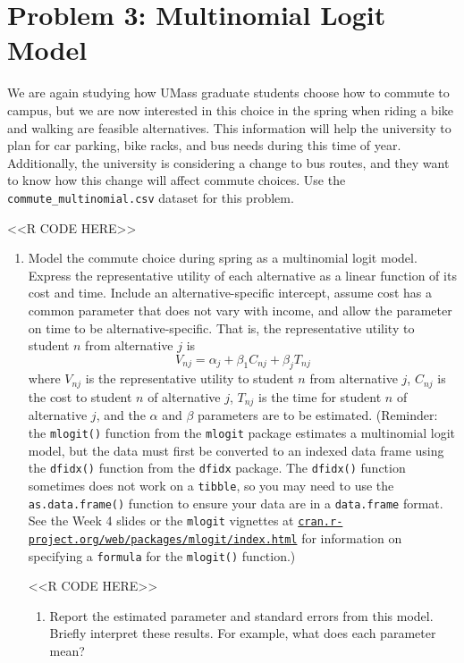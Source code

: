 \documentclass[11pt,letterpaper]{article}
\begin{document}
\section*{Problem 3: Multinomial Logit Model}

We are again studying how UMass graduate students choose how to commute to campus, but we are now interested in this choice in the spring when riding a bike and walking are feasible alternatives. This information will help the university to plan for car parking, bike racks, and bus needs during this time of year. Additionally, the university is considering a change to bus routes, and they want to know how this change will affect commute choices. Use the \texttt{commute\_multinomial.csv} dataset for this problem.

<<R CODE HERE>>

\begin{enumerate}[label=\alph*., leftmargin=*]
	\item Model the commute choice during spring as a multinomial logit model. Express the representative utility of each alternative as a linear function of its cost and time. Include an alternative-specific intercept, assume cost has a common parameter that does not vary with income, and allow the parameter on time to be alternative-specific. That is, the representative utility to student $n$ from alternative $j$ is
	$$V_{nj} = \alpha_j + \beta_1 C_{nj} + \beta_j T_{nj}$$
	where $V_{nj}$ is the representative utility to student $n$ from alternative $j$, $C_{nj}$ is the cost to student $n$ of alternative $j$, $T_{nj}$ is the time for student $n$ of alternative $j$, and the $\alpha$ and $\beta$ parameters are to be estimated. (Reminder: the \texttt{mlogit()} function from the \texttt{mlogit} package estimates a multinomial logit model, but the data must first be converted to an indexed data frame using the \texttt{dfidx()} function from the \texttt{dfidx} package. The \texttt{dfidx()} function sometimes does not work on a \texttt{tibble}, so you may need to use the \texttt{as.data.frame()} function to ensure your data are in a \texttt{data.frame} format. See the Week 4 slides or the \texttt{mlogit} vignettes at \href{https://cran.r-project.org/web/packages/mlogit/index.html}{\texttt{cran.r-project.org/web/packages/mlogit/index.html}} for information on specifying a \texttt{formula} for the \texttt{mlogit()} function.)

	<<R CODE HERE>>

	\begin{enumerate}[label=\roman*.]
		\item Report the estimated parameter and standard errors from this model. Briefly interpret these results. For example, what does each parameter mean?


\end{enumerate}
\end{enumerate}
\end{document}
